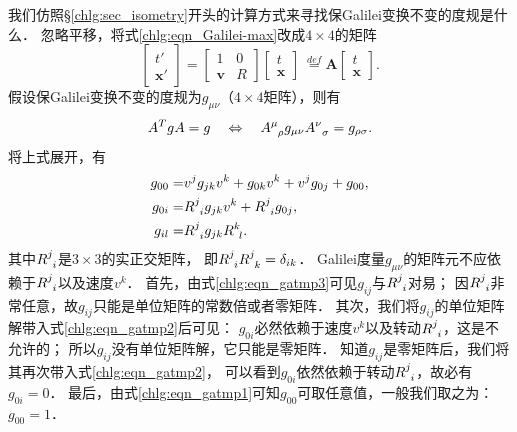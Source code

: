 我们仿照\S\ref{chlg:sec_isometry}开头的计算方式来寻找保Galilei变换不变的度规是什么．
忽略平移，将式\eqref{chlg:eqn_Galilei-max}改成$4\times 4$的矩阵
\begin{equation}
	\begin{bmatrix}  t' \\ \boldsymbol{x}'   \end{bmatrix} =
	\begin{bmatrix}  1 & 0  \\ \boldsymbol{v} & R   \end{bmatrix}
	\begin{bmatrix}  t \\ \boldsymbol{x}  \end{bmatrix} 
	\  \overset{def}{=} \boldsymbol{A} \begin{bmatrix}  t \\ \boldsymbol{x}  \end{bmatrix} .
\end{equation}
假设保Galilei变换不变的度规为$g_{\mu\nu}$（$4\times 4$矩阵），则有
\begin{equation}
	A^T g A = g \quad \Leftrightarrow \quad
	A^{\mu}_{\hphantom{\mu}\rho} g_{\mu\nu} A^{\nu}_{\hphantom{\mu}\sigma} = g_{\rho\sigma}.
\end{equation}
将上式展开，有
\begin{align}
	g_{00} = & v^j g_{jk} v^k + g_{0k} v^k + v^j g_{0j} + g_{00}, \label{chlg:eqn_gatmp1} \\
	g_{0i} = & R^{j}_{\hphantom{j}i} g_{jk} v^k + R^j_{\hphantom{j}i} g_{0j}, \label{chlg:eqn_gatmp2} \\
	g_{il} = & R^j_{\hphantom{j}i} g_{jk} R^k_{\hphantom{j}l} . \label{chlg:eqn_gatmp3}
\end{align}
其中$R^{j}_{\hphantom{j}i}$是$3\times 3$的实正交矩阵，
即$R^{j}_{\hphantom{j}i} R^{j}_{\hphantom{j}k} =\delta_{ik}$．
Galilei度量$g_{\mu\nu}$的矩阵元不应依赖于$R^{j}_{\hphantom{j}i}$以及速度$v^k$．
首先，由式\eqref{chlg:eqn_gatmp3}可见$g_{ij}$与$R^{j}_{\hphantom{j}i}$对易；
因$R^{j}_{\hphantom{j}i}$非常任意，故$g_{ij}$只能是单位矩阵的常数倍或者零矩阵．
其次，我们将$g_{ij}$的单位矩阵解带入式\eqref{chlg:eqn_gatmp2}后可见：
$g_{0i}$必然依赖于速度$v^k$以及转动$R^{j}_{\hphantom{j}i}$，这是不允许的；
所以$g_{ij}$没有单位矩阵解，它只能是零矩阵．
知道$g_{ij}$是零矩阵后，我们将其再次带入式\eqref{chlg:eqn_gatmp2}，
可以看到$g_{0i}$依然依赖于转动$R^{j}_{\hphantom{j}i}$，故必有$g_{0i}=0$．
最后，由式\eqref{chlg:eqn_gatmp1}可知$g_{00}$可取任意值，一般我们取之为：$g_{00}=1$．

